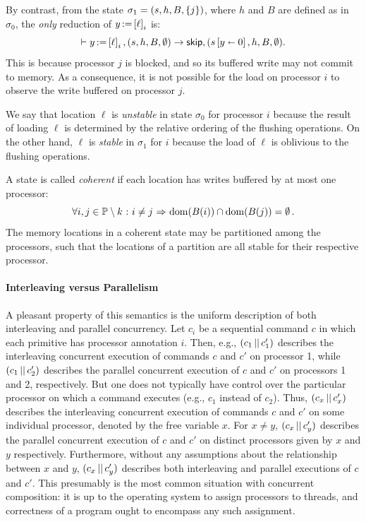 \documentclass[11pt]{article}
\begin{document}
By contrast, from the state $\sigma_1 = (s,h,B,\left\lbrace j \right\rbrace)$, where $h$ and $B$ are defined as in $\sigma_0$, the \emph{only} reduction of $y \operatorname{:\!=} \left[ \ell \right]_i$ is: \[ \vdash y \operatorname{:\!=} \left[ \ell \right]_i,(s,h,B,\operatorname{\emptyset}) \rightarrow \operatorname{\mathsf{skip}},(s \left[ y \shortleftarrow 0 \right],h,B,\operatorname{\emptyset}).\] This is because processor $j$ is blocked, and so its buffered write may not commit to memory. As a consequence, it is not possible for the load on processor $i$ to observe the write buffered on processor $j$. 

We say that location $\ell$ is \emph{unstable} in state $\sigma_0$ for processor $i$ because the result of loading $\ell$ is determined by the relative ordering of the flushing operations. On the other hand, $\ell$ is \emph{stable} in $\sigma_1$ for $i$ because the load of $\ell$ is oblivious to the flushing operations. 

A state is called \emph{coherent} if each location has writes buffered by at most one processor: \[ \forall i,j \in \mathbb{P} \setminus k \operatorname{\,:\,} i \neq j \operatorname{\,\Rightarrow\,} \operatorname{\mathrm{dom}}(B(i)) \cap \operatorname{\mathrm{dom}}(B(j)) = \operatorname{\emptyset}.\] The memory locations in a coherent state may be partitioned among the processors, such that the locations of a partition are all stable for their respective processor.

\paragraph{Interleaving versus Parallelism} A pleasant property of this semantics is the uniform description of both interleaving and parallel concurrency. Let $c_i$ be a sequential command $c$ in which each primitive has processor annotation $i$. Then, e.g., $(c_1 \operatorname{||} c'_1)$ describes the interleaving concurrent execution of commands $c$ and $c'$ on processor 1, while $(c_1 \operatorname{||} c'_2)$ describes the parallel concurrent execution of $c$ and $c'$ on processors 1 and 2, respectively. But one does not typically have control over the particular processor on which a command executes (e.g., $c_1$ instead of $c_2$). Thus, $(c_x \operatorname{||} c'_x)$ describes the interleaving concurrent execution of commands $c$ and $c'$ on some individual processor, denoted by the free variable $x$. For $x \neq y$, $(c_x \operatorname{||} c'_y)$ describes the parallel concurrent execution of $c$ and $c'$ on distinct processors given by $x$ and $y$ respectively. Furthermore, without any assumptions about the relationship between $x$ and $y$, $(c_x \operatorname{||} c'_y)$ describes both interleaving and parallel executions of $c$ and $c'$. This presumably is the most common situation with concurrent composition: it is up to the operating system to assign processors to threads, and correctness of a program ought to encompass any such assignment. 
\end{document}
